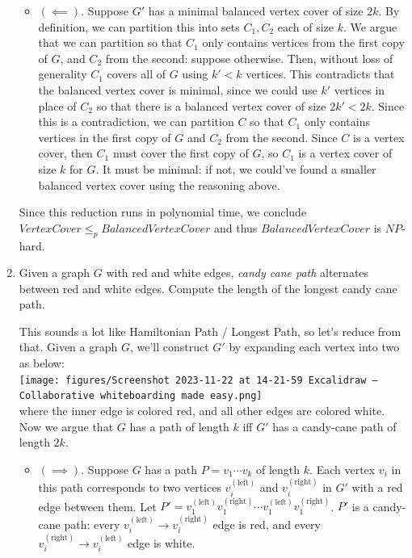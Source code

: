 \documentclass[fleqn]{article}
\begin{document}
\begin{enumerate}
\begin{answer}
\begin{itemize}
            \item $(\impliedby)$. Suppose $G'$ has a minimal balanced vertex cover of size $2k$. By definition, we can partition this into sets $C_1, C_2$ each of size $k$. We argue that we can partition so that $C_1$ only contains vertices from the first copy of $G$, and $C_2$ from the second: suppose otherwise. Then, without loss of generality $C_1$ covers all of $G$ using $k' < k$ vertices. This contradicts that the balanced vertex cover is minimal, since we could use $k'$ vertices in place of $C_2$ so that there is a balanced vertex cover of size $2k' < 2k$. Since this is a contradiction, we can partition $C$ so that $C_1$ only contains vertices in the first copy of $G$ and $C_2$ from the second. Since $C$ is a vertex cover, then $C_1$ must cover the first copy of $G$, so $C_1$ is a vertex cover of size $k$ for $G$. It must be minimal: if not, we could've found a smaller balanced vertex cover using the reasoning above.
        \end{itemize}
        Since this reduction runs in polynomial time, we conclude $VertexCover \leq_p BalancedVertexCover$ and thus $BalancedVertexCover$ is $NP$-hard.
    \end{answer}
    \item Given a graph $G$ with red and white edges, \textit{candy cane path} alternates between red and white edges. Compute the length of the longest candy cane path.
    \begin{answer}
        This sounds a lot like Hamiltonian Path / Longest Path, so let's reduce from that. Given a graph $G$, we'll construct $G'$ by expanding each vertex into two as below: \\
        \texttt{[image: figures/Screenshot 2023-11-22 at 14-21-59 Excalidraw — Collaborative whiteboarding made easy.png]} \\
        where the inner edge is colored red, and all other edges are colored white.
        Now we argue that $G$ has a path of length $k$ iff $G'$ has a candy-cane path of length $2k$.
        \begin{itemize}
            \item $(\implies)$. Suppose $G$ has a path $P = v_1\cdots v_k$ of length $k$. Each vertex $v_i$ in this path corresponds to two vertices $v_i^{(\text{left})}$ and $v_i^{(\text{right})}$ in $G'$ with a red edge between them. Let $P' = v_1^{(\text{left})}v_1^{(\text{right})}\cdots v_1^{(\text{left})}v_1^{(\text{right})}$. $P'$ is a candy-cane path: every $v_i^{(\text{left})} \to v_i^{(\text{right})}$ edge is red, and every $v_i^{(\text{right})} \to v_i^{(\text{left})}$ edge is white.

\end{itemize}
\end{answer}
\end{enumerate}
\end{document}
